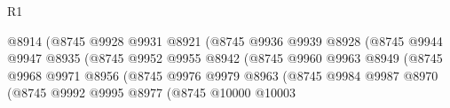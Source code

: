 \begin{lexlean}{R1}
\begin{coremodule}
                                                  @8914
                                                  (@8745
                                                    @9928
                                                    @9931
                                                    @8921
                                                    (@8745
                                                      @9936
                                                      @9939
                                                      @8928
                                                      (@8745
                                                        @9944
                                                        @9947
                                                        @8935
                                                        (@8745
                                                          @9952
                                                          @9955
                                                          @8942
                                                          (@8745
                                                            @9960
                                                            @9963
                                                            @8949
                                                            (@8745
                                                              @9968
                                                              @9971
                                                              @8956
                                                              (@8745
                                                                @9976
                                                                @9979
                                                                @8963
                                                                (@8745
                                                                  @9984
                                                                  @9987
                                                                  @8970
                                                                  (@8745
                                                                    @9992
                                                                    @9995
                                                                    @8977
                                                                    (@8745
                                                                      @10000
                                                                      @10003

\end{coremodule}
\end{lexlean}
